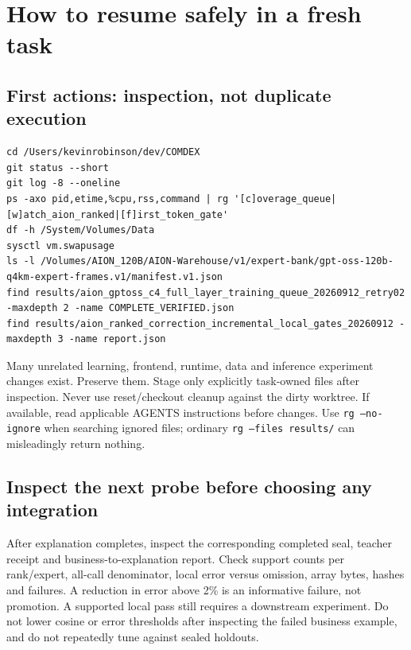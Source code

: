 \documentclass[11pt,a4paper]{article}
\begin{document}
\section{How to resume safely in a fresh task}
\subsection{First actions: inspection, not duplicate execution}
\begin{lstlisting}
cd /Users/kevinrobinson/dev/COMDEX
git status --short
git log -8 --oneline
ps -axo pid,etime,%cpu,rss,command | rg '[c]overage_queue|[w]atch_aion_ranked|[f]irst_token_gate'
df -h /System/Volumes/Data
sysctl vm.swapusage
ls -l /Volumes/AION_120B/AION-Warehouse/v1/expert-bank/gpt-oss-120b-q4km-expert-frames.v1/manifest.v1.json
find results/aion_gptoss_c4_full_layer_training_queue_20260912_retry02 -maxdepth 2 -name COMPLETE_VERIFIED.json
find results/aion_ranked_correction_incremental_local_gates_20260912 -maxdepth 3 -name report.json
\end{lstlisting}
Many unrelated learning, frontend, runtime, data and inference experiment
changes exist. Preserve them. Stage only explicitly task-owned files after
inspection. Never use reset/checkout cleanup against the dirty worktree.
If available, read applicable AGENTS instructions before changes.
Use \texttt{rg --no-ignore} when searching ignored  files;
ordinary \texttt{rg --files results/} can misleadingly return nothing.

\subsection{Inspect the next probe before choosing any integration}
After explanation completes, inspect the corresponding completed seal,
teacher receipt and business-to-explanation report. Check support counts per
rank/expert, all-call denominator, local error versus omission, array bytes,
hashes and failures. A reduction in error above 2\% is an informative failure,
not promotion. A supported local pass still requires a downstream experiment.
Do not lower cosine or error thresholds after inspecting the failed business
example, and do not repeatedly tune against sealed holdouts.
\end{document}
